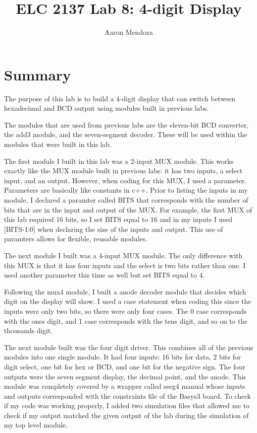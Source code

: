 \documentclass[11pt]{article}
\begin{document}
\title{ELC 2137 Lab 8: 4-digit Display}
\author{Aaron Mendoza}

\maketitle


\section*{Summary}

The purpose of this lab is to build a 4-digit display that can switch between hexadecimal and BCD output using modules built in previous labs.

The modules that are used from previous labs are the eleven-bit BCD converter, the add3 module, and the seven-segment decoder. These will be used within the modules that were built in this lab. 

The first module I built in this lab was a 2-input MUX module. This works exactly like the MUX module built in previous labs: it has two inputs, a select input, and an output. However, when coding for this MUX, I used a parameter. Parameters are basically like constants in c++. Prior to listing the inputs in my module, I declared a paramter called BITS that corresponds with the number of bits that are in the input and output of the MUX. For example, the first MUX of this lab required 16 bits, so I set BITS equal to 16 and in my inputs I used [BITS-1:0] when declaring the size of the inputs and output. This use of paramters allows for flexible, reusable modules. 

The next module I built was a 4-input MUX module. The only difference with this MUX is that it has four inputs and the select is two bits rather than one. I used another parameter this time as well but set BITS equal to 4.

Following the mux4 module, I built a anode decoder module that decides which digit on the display will show. I used a case statement when coding this since the inputs were only two bits, so there were only four cases. The 0 case corresponds with the ones digit, and 1 case corresponds with the tens digit, and so on to the thousands digit.

The next module built was the four digit driver. This combines all of the previous modules into one single module. It had four inputs: 16 bits for data, 2 bits for digit select, one bit for hex or BCD, and one bit for the negative sign. The four outputs were the seven segment display, the decimal point, and the anode. This module was completely covered by a wrapper called sseg4 manual whose inputs and outputs corresponded with the constraints file of the Basys3 board. To check if my code was working properly, I added two simulation files that allowed me to check if my output matched the given output of the lab during the simulation of my top level module.
\end{document}
